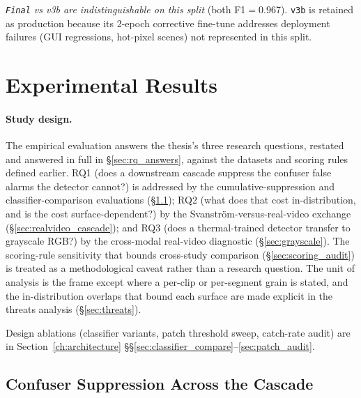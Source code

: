 \emph{\texttt{Final} vs v3b are indistinguishable on this split} (both F1$=$0.967). \texttt{v3b} is retained as production because its 2-epoch corrective fine-tune addresses deployment failures (GUI regressions, hot-pixel scenes) not represented in this split.

\section{Experimental Results}
\label{ch:experiments}

\paragraph{Study design.}
The empirical evaluation answers the thesis's three research questions, restated and answered in full in \S\ref{sec:rq_answers}, against the datasets and scoring rules defined earlier. RQ1 (does a downstream cascade suppress the confuser false alarms the detector cannot?) is addressed by the cumulative-suppression and classifier-comparison evaluations (\S\ref{sec:cumulative}); RQ2 (what does that cost in-distribution, and is the cost surface-dependent?) by the Svanstr\"om-versus-real-video exchange (\S\ref{sec:realvideo_cascade}); and RQ3 (does a thermal-trained detector transfer to grayscale RGB?) by the cross-modal real-video diagnostic (\S\ref{sec:grayscale}). The scoring-rule sensitivity that bounds cross-study comparison (\S\ref{sec:scoring_audit}) is treated as a methodological caveat rather than a research question. The unit of analysis is the frame except where a per-clip or per-segment grain is stated, and the in-distribution overlaps that bound each surface are made explicit in the threats analysis (\S\ref{sec:threats}).

Design ablations (classifier variants, patch threshold sweep, catch-rate audit) are in Section~\ref{ch:architecture} \S\S\ref{sec:classifier_compare}--\ref{sec:patch_audit}.

\subsection{Confuser Suppression Across the Cascade}
\label{sec:cumulative}

